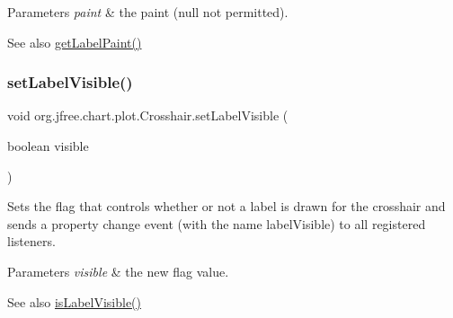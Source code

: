 \begin{DoxyParams}{Parameters}
{\em paint} & the paint ({\ttfamily null} not permitted).\\
\hline
\end{DoxyParams}
\begin{DoxySeeAlso}{See also}
\mbox{\hyperlink{classorg_1_1jfree_1_1chart_1_1plot_1_1_crosshair_a45139a89c17fbaf039ed7df2d5441f17}{get\+Label\+Paint()}} 
\end{DoxySeeAlso}
\mbox{\label{classorg_1_1jfree_1_1chart_1_1plot_1_1_crosshair_ad7c7a7056ae228ddc663c8c7a64cedf2}} 
\subsubsection{\texorpdfstring{set\+Label\+Visible()}{setLabelVisible()}}
{\footnotesize\ttfamily void org.\+jfree.\+chart.\+plot.\+Crosshair.\+set\+Label\+Visible (\begin{DoxyParamCaption}\item[{boolean}]{visible }\end{DoxyParamCaption})}

Sets the flag that controls whether or not a label is drawn for the crosshair and sends a property change event (with the name \textquotesingle{}label\+Visible\textquotesingle{}) to all registered listeners.


\begin{DoxyParams}{Parameters}
{\em visible} & the new flag value.\\
\hline
\end{DoxyParams}
\begin{DoxySeeAlso}{See also}
\mbox{\hyperlink{classorg_1_1jfree_1_1chart_1_1plot_1_1_crosshair_a57d3fed41cf715e092ccee249b19ee12}{is\+Label\+Visible()}} 
\end{DoxySeeAlso}
\mbox{\label{classorg_1_1jfree_1_1chart_1_1plot_1_1_crosshair_a75ba4d6a36718d4c71a71fd65f2896f9}} 
